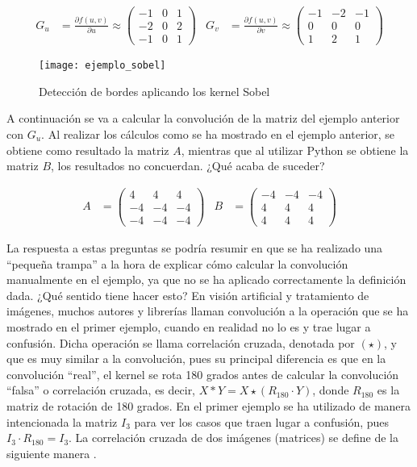 			\begin{align*}
				G_u &= \frac{\partial f(u, v)}{\partial u} \approx \begin{pmatrix}
					-1 & 0 & 1\\
					-2 & 0 & 2\\
					-1 & 0 & 1
				\end{pmatrix}&
				G_v &= \frac{\partial f(u, v)}{\partial v} \approx \begin{pmatrix}
					-1 & -2 & -1\\
					0 & 0 & 0\\
					1 & 2 & 1
				\end{pmatrix}
			\end{align*}
			
			\begin{figure}[!h]
				\centering
				\texttt{[image: ejemplo\_sobel]}
				\caption{Detección de bordes aplicando los kernel Sobel}
				\label{fig:sobel}
			\end{figure}
			
			A continuación se va a calcular la convolución de la matriz del ejemplo anterior con $G_u$. Al realizar los cálculos como se ha mostrado en el ejemplo anterior, se obtiene como resultado la matriz $A$, mientras que al utilizar Python se obtiene la matriz $B$, los resultados no concuerdan. ¿Qué acaba de suceder? 
			
			\begin{align*} A &= 
				\begin{pmatrix}
					4 & 4 & 4\\
					-4 & -4 & -4\\
					-4 & -4 & -4
				\end{pmatrix}&
				B &= \begin{pmatrix}
					-4 & -4 & -4\\
					4 & 4 & 4\\
					4 & 4 & 4
				\end{pmatrix}
			\end{align*}
			
			La respuesta a estas preguntas se podría resumir en que se ha realizado una ``pequeña trampa'' a la hora de explicar cómo calcular la convolución manualmente en el ejemplo, ya que no se ha aplicado correctamente la definición dada. ¿Qué sentido tiene hacer esto? En visión artificial y tratamiento de imágenes, muchos autores y librerías llaman convolución a la operación que se ha mostrado en el primer ejemplo, cuando en realidad no lo es y trae lugar a confusión. Dicha operación se llama correlación cruzada, denotada por $(\star)$, y que es muy similar a la convolución, pues su principal diferencia es que en la convolución ``real'', el kernel se rota 180 grados antes de calcular la convolución ``falsa'' o correlación cruzada, es decir, $X \ast Y = X \star (R_{180} \cdot Y)$, donde $R_{180}$ es la matriz de rotación de 180 grados. En el primer ejemplo se ha utilizado de manera intencionada la matriz $I_3$ para ver los casos que traen lugar a confusión, pues $I_3 \cdot R_{180} = I_3$. La correlación cruzada de dos imágenes (matrices) se define de la siguiente manera \cite{Goodfellow-et-al-2016}. 
			
